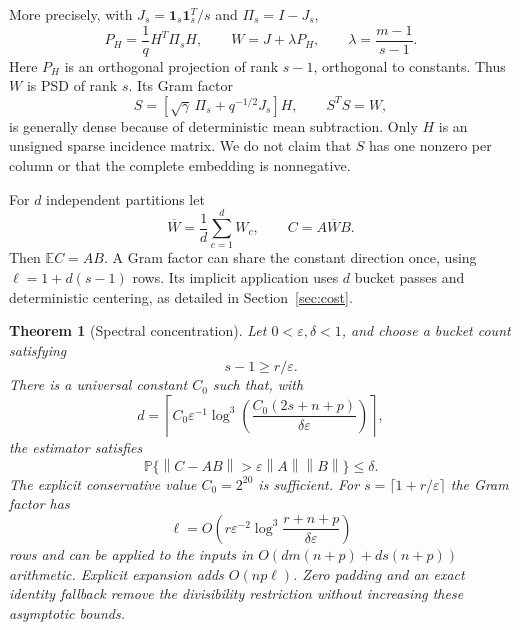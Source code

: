 \documentclass[11pt]{article}
\newtheorem{theorem}{Theorem}[section]
\newcommand{\E}{\mathbb E}
\newcommand{\Prob}{\mathbb P}
\newcommand{\norm}[1]{\left\lVert#1\right\rVert}
\begin{document}
More precisely, with $J_s=\mathbf1_s\mathbf1_s^T/s$ and $\Pi_s=I-J_s$,
\begin{equation}\label{eq:projection}
 P_H=\frac1q H^T\Pi_s H,\qquad
 W=J+\lambda P_H,\qquad \lambda=\frac{m-1}{s-1}.
\end{equation}
Here $P_H$ is an orthogonal projection of rank $s-1$, orthogonal to
constants. Thus $W$ is PSD of rank $s$. Its Gram factor
\begin{equation}\label{eq:singlefactor}
 S=[\sqrt\gamma\,\Pi_s+q^{-1/2}J_s]H,
 \qquad S^TS=W,
\end{equation}
is generally dense because of deterministic mean subtraction. Only $H$
is an unsigned sparse incidence matrix. We do not claim that $S$ has one
nonzero per column or that the complete embedding is nonnegative.

For $d$ independent partitions let
\[
 \overline W=\frac1d\sum_{c=1}^d W_c,\qquad C=A\overline W B.
\]
Then $\E C=AB$. A Gram factor can share the constant direction once,
using $\ell=1+d(s-1)$ rows. Its implicit application uses $d$ bucket
passes and deterministic centering, as detailed in Section~\ref{sec:cost}.

\begin{theorem}[Spectral concentration]\label{thm:main}
Let $0<\varepsilon,\delta<1$, and choose a bucket count satisfying
\begin{equation}\label{eq:s}
 s-1\ge r/\varepsilon.
\end{equation}
There is a universal constant $C_0$ such that, with
\begin{equation}\label{eq:d}
 d=\left\lceil C_0\varepsilon^{-1}
       \log^3\!\left(\frac{C_0(2s+n+p)}{\delta\varepsilon}\right)
      \right\rceil,
\end{equation}
the estimator satisfies
\begin{equation}\label{eq:mainerror}
 \Prob\{\norm{C-AB}>\varepsilon\norm A\norm B\}\le\delta.
\end{equation}
The explicit conservative value $C_0=2^{20}$ is sufficient.
For $s=\lceil1+r/\varepsilon\rceil$ the Gram factor has
\begin{equation}\label{eq:width}
 \ell=O\!\left(r\varepsilon^{-2}
            \log^3\!\frac{r+n+p}{\delta\varepsilon}\right)
\end{equation}
rows and can be applied to the inputs in
$O(dm(n+p)+ds(n+p))$ arithmetic. Explicit expansion adds $O(np\ell)$.
Zero padding and an exact identity fallback remove the divisibility
restriction without increasing these asymptotic bounds.
\end{theorem}
\end{document}
